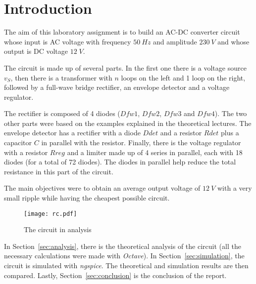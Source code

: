 \section{Introduction}
\label {sec:introduction}


The aim of this laboratory assignment is to build an AC-DC converter circuit whose input is AC voltage with frequency $50 \ Hz$ and amplitude $230 \ V$ and whose output is DC voltage $12 \; V$.


The circuit is made up of several parts. In the first one there is a voltage source $v_S$, then there is a transformer with $n$ loops on the left and 1 loop on the right, followed by a full-wave bridge rectifier, an envelope detector and a voltage regulator.

The rectifier is composed of 4 diodes ($Dfw1$, $Dfw2$, $Dfw3$ and $Dfw4$). The two other parts were based on the examples explained in the theoretical lectures. The envelope detector has a rectifier with a diode $Ddet$ and a resistor $Rdet$ plus a capacitor $C$ in parallel with the resistor. Finally, there is the voltage regulator with a resistor $Rreg$ and a limiter made up of 4 series in parallel, each with 18 diodes (for a total of 72 diodes). The diodes in parallel help reduce the total resistance in this part of the circuit.


The main objectives were to obtain an average output voltage of $12 \ V$ with a very small ripple while having the cheapest possible circuit.

\begin{figure}[H] \centering
\texttt{[image: rc.pdf]}
\caption{The circuit in analysis}
\label{fig:circuit}
\end{figure}


In Section~\ref{sec:analysis}, there is the theoretical analysis of the circuit (all the necessary calculations were made with \textit{Octave}). In Section~\ref{sec:simulation}, the circuit is simulated with \textit{ngspice}. The theoretical and simulation results are then compared. Lastly,  Section~\ref{sec:conclusion} is the conclusion of the report. 

